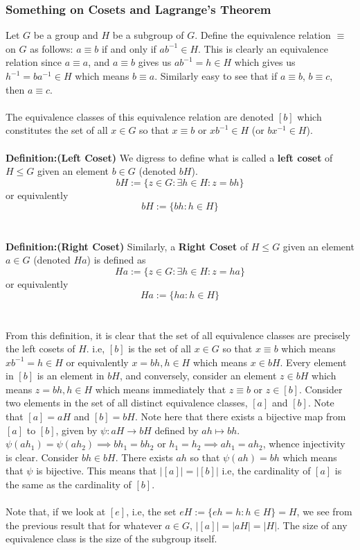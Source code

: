 \documentclass[../Main.tex]{subfiles}
\begin{document}
\subsubsection{Something on Cosets and Lagrange's Theorem}
Let $G$ be a group and $H$ be a subgroup of $G$. Define the equivalence relation $\equiv$ on $G$ as follows: $a \equiv b$ if and only if $ab^{-1} \in H$. This is clearly an equivalence relation since $a\equiv a$, and $a\equiv b$ gives us $ab^{-1}=h \in H$ which gives us $h^{-1}=ba^{-1}\in H$ which means $b\equiv a$. Similarly easy to see that if $a\equiv b$, $b\equiv c$, then $a\equiv c$. 
\\\\ The equivalence classes of this equivalence relation are denoted $[b]$ which constitutes the set of all $x \in G$ so that $x\equiv b$ or $xb^{-1}\in H$ (or $bx^{-1} \in H$). 
\\\\ \textbf{Definition:(Left Coset)} We digress to define what is called a \textbf{left coset} of $H\leq G$ given an element $b \in G$ (denoted $bH$). $$bH:=\{z\in G: \exists h \in H: z=bh\}$$ or equivalently $$bH:=\{bh:h\in H\}$$
\\\\ \textbf{Definition:(Right Coset)} Similarly, a \textbf{Right Coset} of $H \leq G$ given an element $a \in G$ (denoted $Ha$) is defined as $$Ha:=\{z \in G: \exists h \in H: z=ha\} $$ or equivalently $$Ha:=\{ha: h \in H\} $$
\\\\From this definition, it is clear that the set of all equivalence classes are precisely the left cosets of $H$. i.e, $[b]$ is the set of all $x \in G$ so that $x \equiv b$ which means $xb^{-1}=h\in H$ or equivalently $x=bh, h\in H$ which means $x \in bH$. Every element in $[b]$ is an element in $bH$, and conversely, consider an element $z \in bH$ which means $z=bh, h \in H$ which means immediately that $z \equiv b$ or $z \in [b]$. Consider two elements in the set of all distinct equivalence classes, $[a]$ and $[b]$. Note that $[a]=aH$ and $[b]=bH$. Note here that there exists a bijective map from $[a]$ to $[b]$, given by $\psi:aH \to bH$ defined by $ah \mapsto bh$. $\psi(ah_1)=\psi(ah_2) \implies bh_1=bh_2$ or $h_1=h_2 \implies ah_1=ah_2$, whence injectivity is clear. Consider $bh \in bH$. There exists $ah$ so that $\psi(ah)=bh$ which means that $\psi$ is bijective. This means that $|[a]|=|[b]|$ i.e, the cardinality of $[a]$ is the same as the cardinality of $[b]$.
\\\\ Note that, if we look at $[e]$, i.e, the set $eH:=\{eh=h: h \in H\}=H$, we see from the previous result that for whatever $a \in G$, $|[a]|=|aH|=|H|$. The size of any equivalence class is the size of the subgroup itself. 
\end{document}
